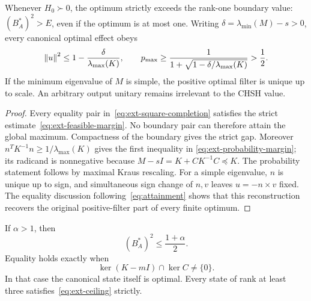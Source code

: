 \begin{corollary}
\label{cor:ext-boundary-gap}
Whenever $H_0\succ0$, the optimum strictly exceeds the rank-one
boundary value: $(B_A^*)^2>E$, even if the optimum is at most one.
Writing $\delta=\lambda_{\min}(M)-s>0$, every canonical optimal
effect obeys
\begin{equation}
 \left\lVert u\right\rVert^2\le1-\frac{\delta}{\lambda_{\max}(K)},\qquad
 p_{\max}\ge
 \frac1{1+\sqrt{1-\delta/\lambda_{\max}(K)}}>\frac12.
 \label{eq:ext-probability-margin}
\end{equation}
If the minimum eigenvalue of $M$ is simple, the positive optimal
filter is unique up to scale. An arbitrary output unitary remains
irrelevant to the CHSH value.
\end{corollary}

\begin{proof}
Every equality pair in~\eqref{eq:ext-square-completion} satisfies
the strict estimate~\eqref{eq:ext-feasible-margin}. No boundary pair
can therefore attain the global maximum. Compactness of the boundary
gives the strict gap. Moreover
$n^TK^{-1}n\ge1/\lambda_{\max}(K)$ gives the first inequality in
\eqref{eq:ext-probability-margin}; its radicand is nonnegative because
$M-sI=K+CK^{-1}C\preceq K$.
The probability statement follows by maximal Kraus rescaling.
For a simple eigenvalue, $n$ is unique up to sign, and simultaneous
sign change of $n,v$ leaves $u=-n\times v$ fixed.
The equality discussion following~\eqref{eq:attainment} shows that
this reconstruction recovers the original positive-filter part of
every finite optimum.
\end{proof}

\begin{corollary}
\label{cor:ext-ceiling}
If $\alpha>1$, then
\begin{equation}
 (B_A^*)^2\le\frac{1+\alpha}{2}.
 \label{eq:ext-ceiling}
\end{equation}
Equality holds exactly when
\begin{equation}
 \ker(K-mI)\cap\ker C\ne\{0\}.
 \label{eq:ext-ceiling-equality}
\end{equation}
In that case the canonical state itself is optimal. Every state of rank
at least three satisfies~\eqref{eq:ext-ceiling} strictly.
\end{corollary}

